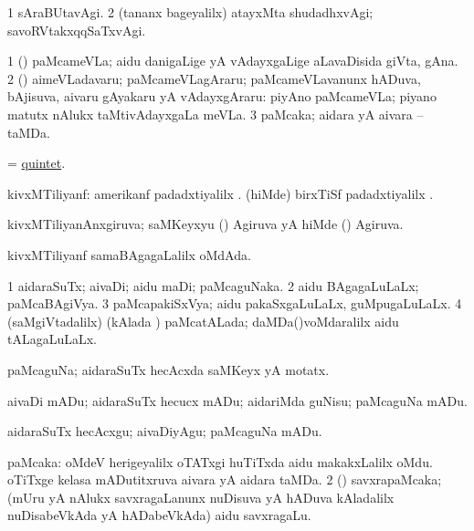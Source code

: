 \bentry
{}
\gl{\kirxvi}
\bmng
\bnum
\num{1} sAraBUtavAgi. 
\num{2} (tananx bageyalilx) atayxMta shudadhxvAgi; savoRVtakxqqSaTxvAgi. 
\enum
\emng
\eentry

\bentry
{}
\gl{\nA}
\bmng
\bnum
\num{1} (\saM) paMcameVLa; aidu danigaLige yA vAdayxgaLige aLavaDisida giVta, gAna. 
\num{2} (\saM) aimeVLadavaru; paMcameVLagAraru; paMcameVLavanunx hADuva, bAjisuva, aivaru gAyakaru yA vAdayxgAraru:   piyAno paMcameVLa; piyano matutx nAlukx taMtivAdayxgaLa meVLa. 
\num{3} paMcaka; aidara yA aivara -- taMDa. 
\enum
\emng
\eentry

\bentry
{}
\gl{\nA}
\bmng
= \hyperlink{quintet}{quintet}. 
\emng
\eentry

\bentry
{}
\gl{\nA}
\bmng
kivxMTiliyanf: 
\banum
{} amerikanf padadxtiyalilx . 
 (hiMde) birxTiSf padadxtiyalilx . 
\eanum
\emng
\eentry

\bentry
{}
\gl{\gu}
\bmng
kivxMTiliyanAnxgiruva; saMKeyxyu (\ame)  Agiruva yA hiMde (\birx)  Agiruva. 
\emng
\eentry

\bentry
{}
\gl{\nA}
\expl{}
\bmng
kivxMTiliyanf samaBAgagaLalilx oMdAda. 
\emng
\eentry

\bentry
{}
\gl{\gu}
\bmng
\bnum
\num{1} aidaraSuTx; aivaDi; aidu maDi; paMcaguNaka. 
\num{2} aidu BAgagaLuLaLx; paMcaBAgiVya. 
\num{3} paMcapakiSxVya; aidu pakaSxgaLuLaLx, guMpugaLuLaLx. 
\num{4} (saMgiVtadalilx) (kAlada \vi) paMcatALada; daMDa()voMdaralilx aidu tALagaLuLaLx. 
\enum
\emng
\eentry

\bentry
{}
\gl{\nA}
\bmng
paMcaguNa; aidaraSuTx hecAcxda saMKeyx yA motatx. 
\emng
\eentry

\bentry
{}
\gl{\sakirx}
\bmng
aivaDi mADu; aidaraSuTx hecucx mADu; aidariMda guNisu; paMcaguNa mADu. 
\emng

\noindent
\gl{\akirx}
\bmng
aidaraSuTx hecAcxgu; aivaDiyAgu; paMcaguNa mADu. 
\emng
\eentry

\bentry
{}
\gl{\nA}
\bmng
\bnum
{} paMcaka: 
\banum
{} oMdeV herigeyalilx oTATxgi huTiTxda aidu makakxLalilx oMdu. 
 oTiTxge kelasa mADutitxruva aivara yA aidara taMDa. 
\eanum
\numie
\num{2} (\saM) savxrapaMcaka; (mUru yA nAlukx savxragaLanunx nuDisuva yA hADuva kAladalilx nuDisabeVkAda yA hADabeVkAda) aidu savxragaLu. 
\enum
\emng
\eentry

